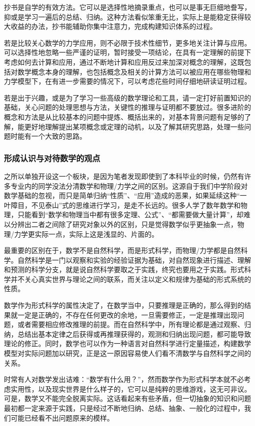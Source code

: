 抄书是自学的有效方法。它可以是选择性地摘录重点，也可以是事无巨细地誊写，抑或是学习一遍后的总结、归纳。这种方法看似笨重无比，实际上是能稳定获得较大收益的办法，抄书能辅助你集中注意力，完成构建知识体系的过程。

若是比较关心数学的力学应用，则不必限于技术性细节，更多地关注计算与应用。可以选择性地忽略一些严谨的证明，暂时接受一项结论，在具有一定理解的前提下考虑如何去计算和应用，通过不断地计算和应用反过来加深对概念的理解，这既包括对数学概念本身的理解，也包括概念及相关的计算方法可以被应用在哪些物理和力学模型下，在有进一步需要的情况下，可以考虑花些时间仔细地研读证明过程。

若是出于兴趣，或是为了学习一些高级的数学理论和工具，请一定打好前置知识的基础，关心问题的处理思想与方法，关键性的推理与证明都不要放过。很多进阶的概念和方法是从比较基本的问题中提炼、概括出来的，对基本背景问题有足够的了解，能更好地理解提出某项概念或定理的动机，以及了解其研究思路，处理一些问题时能有一个大致的思路。

\subsubsection{形成认识与对待数学的观点}

之所以单独开设这一个板块，是因为笔者发现即使到了本科毕业的时候，仍然有许多专业内的同学没法分清数学和物理/力学之间的区别。这源自于我们中学阶段对数学基础的忽视，而只是简单归纳“性质”、“应用”造成的恶果，如果延续这种“一叶障目，不见泰山”式的思维进行学习，是走不长远的。很多人学了数年数学和物理，只能看到“数学和物理当中都有很多定理、公式”、“都需要做大量计算”，却难以分辨出二者之间除了研究对象以外的区别，只是觉得数学似乎更抽象一点，物理/力学更实际一点，实际上这是浅显的、片面的。

最重要的区别在于，数学不是自然科学，而是形式科学，而物理/力学都是自然科学。自然科学是一门以观察和实验的经验证据为基础，对自然现象进行描述、理解和预测的科学分支，就是说自然科学要取之于实践，终究也要用之于实践。形式科学并不关心真实世界与理论之间的联系，而关注以定义和规律为基础的形式系统的性质。

数学作为形式科学的属性决定了，在数学当中，只要推理是正确的，那么得到的结果就一定是正确的，不存在任何更改的余地，一旦需要修正，一定是推理出现问题，或者需要相应修改推理的前提。而在自然科学中，所有理论都是通过观察、归纳，总结出基本定律之后获得或再推理获得的，观测和归纳出现问题，都可能导致理论的修正。同时，数学也可以作为一种语言对自然科学进行定量描述，构建数学模型对实际问题加以研究，正是这一原因容易使人们看不清数学与自然科学之间的关系。

时常有人对数学发出诘难：“数学有什么用？”，然而数学作为形式科学本就不必考虑实用性，以及现实世界是什么样子的，它可以是纯粹的思维游戏，这无可非议。可是，数学又不能完全脱离实际。这话看起来有些矛盾，但一切抽象的知识和问题最初都一定来源于实践，只是经过不断地归纳、总结、抽象、一般化的过程中，我们可能已经看不出问题原来的模样。


